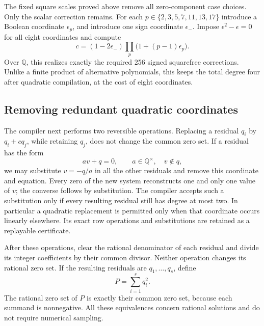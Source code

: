 The fixed square scales proved above remove all zero-component case
choices.  Only the scalar correction remains.  For each
$p\in\{2,3,5,7,11,13,17\}$ introduce a Boolean coordinate $\epsilon_p$,
and introduce one sign coordinate $\epsilon_-$.  Impose
$\epsilon^2-\epsilon=0$ for all eight coordinates and compute
\[
 c=(1-2\epsilon_-)\prod_p\bigl(1+(p-1)\epsilon_p\bigr).
\]
Over $\mathbb Q$, this realizes exactly the required 256 signed squarefree
corrections.  Unlike a finite product of alternative polynomials, this
keeps the total degree four after quadratic compilation, at the cost of
eight coordinates.

\subsection{Removing redundant quadratic coordinates}

The compiler next performs two reversible operations.  Replacing a
residual $q_i$ by $q_i+cq_j$, while retaining $q_j$, does not change the
common zero set.  If a residual has the form
\[
                  av+q=0,\qquad a\in\mathbb Q^\times,
                  \quad v\notin q,
\]
we may substitute $v=-q/a$ in all the other residuals and remove this
coordinate and equation.  Every zero of the new system reconstructs one
and only one value of $v$; the converse follows by substitution.  The
compiler accepts such a substitution only if every resulting residual
still has degree at most two.  In particular a quadratic replacement is
permitted only when that coordinate occurs linearly elsewhere.  Its exact
row operations and substitutions are retained as a replayable certificate.

After these operations, clear the rational denominator of each residual
and divide its integer coefficients by their common divisor.  Neither
operation changes its rational zero set.  If the resulting residuals are
$q_1,\ldots,q_s$, define
\[
                         P=\sum_{i=1}^s q_i^2.
\]
The rational zero set of $P$ is exactly their common zero set, because
each summand is nonnegative.  All these equivalences concern rational
solutions and do not require numerical sampling.


